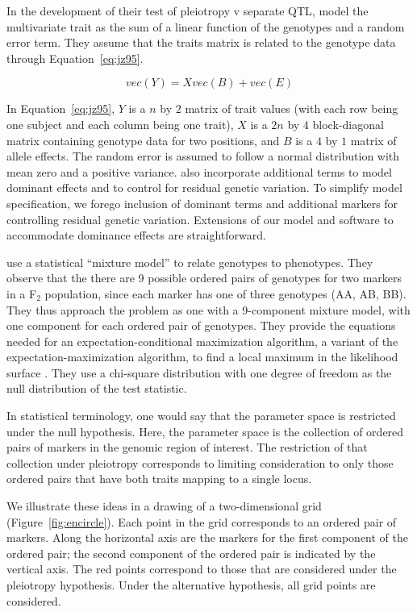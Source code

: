\documentclass[oneside]{book}\usepackage[]{graphicx}\usepackage[]{color}
\begin{document}
In the development of their test of pleiotropy v separate QTL,
\citet{jiang1995multiple} model
the multivariate trait as the sum of a linear function of the genotypes and
a random error term. They assume that the traits matrix is related to the
genotype data through Equation~\ref{eq:jz95}.


\begin{equation}
vec(Y) = Xvec(B) + vec(E)\label{eq:jz95}
\end{equation}


In Equation~\ref{eq:jz95}, $Y$ is a $n$ by $2$ matrix of trait values (with each 
row being one subject and each column being one trait),
$X$ is a $2n$ by $4$ block-diagonal matrix containing
genotype data for two positions, 
and $B$ is a $4$ by $1$ matrix of allele effects.
The random error is assumed to follow a normal distribution with mean zero and a 
positive variance.
\citet{jiang1995multiple} also incorporate additional terms to model
dominant effects and to
control for residual genetic variation.
To simplify model specification, we forego inclusion of dominant terms
and additional markers for controlling residual
genetic variation.
Extensions of our model and software to accommodate dominance effects
are straightforward.


\citet{jiang1995multiple} use a statistical ``mixture model'' to relate
genotypes to phenotypes. 
They observe that the there are 9 possible ordered pairs of genotypes for two
markers in a F$_2$ population, since each marker has
one of three genotypes (AA, AB, BB).
They thus approach the problem as one with a 9-component mixture model, with one 
component for each ordered pair of genotypes. 
They provide the equations needed for an
expectation-conditional maximization algorithm, a variant of
the expectation-maximization
algorithm, to find a local maximum in the likelihood surface 
\citep{dempster1977maximum,meng1993maximum}. 
They use a chi-square distribution with one degree of freedom as the
null distribution of the test statistic. 


In statistical terminology, one would say that the parameter space is restricted
under the null hypothesis. Here, the parameter space is the collection of ordered
pairs of markers in the genomic region of interest.
The restriction of that collection
under pleiotropy corresponds to limiting consideration to only those ordered pairs
that have both traits mapping to a single locus. 

We illustrate these ideas in a drawing of a two-dimensional grid
(Figure~\ref{fig:encircle}).
Each point in the grid corresponds to an ordered pair of
markers. Along the horizontal axis are the markers for the first component of the
ordered pair; the second component of the ordered pair is indicated by the vertical
axis. The red points correspond to those that are considered under the pleiotropy
hypothesis. Under the alternative hypothesis, all grid points are considered.
\end{document}
